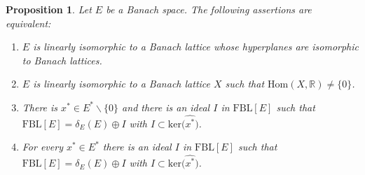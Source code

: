 \documentclass[11pt]{amsart}
\newtheorem{prop}[thm]{Proposition}
\theoremstyle{definition}
\numberwithin{equation}{section}
\newcommand{\fbl}{\text{FBL}}
\begin{document}
\begin{prop}
Let $E$ be a Banach space. The following assertions are equivalent:
\begin{enumerate}
    \item $E$ is linearly isomorphic to a Banach lattice whose hyperplanes are isomorphic to Banach lattices.
    \item $E$ is linearly isomorphic to a Banach lattice $X$ such that $\text{Hom}(X,\mathbb{R})\neq\{0\}$.
    \item There is $x^*\in E^*\backslash\{0\}$ and there is an ideal $I$ in $\fbl[E]$ such that $\fbl[E]=\delta_E(E)\oplus I$ with $I\subset \text{ker}\bigl(\widehat{x^*}\bigr)$.
    \item For every $x^*\in E^*$ there is an ideal $I$ in $\fbl[E]$ such that $\fbl[E]=\delta_E(E)\oplus I$ with $I\subset \text{ker}\bigl(\widehat{x^*}\bigr)$.
\end{enumerate}
\end{prop}
\end{document}

